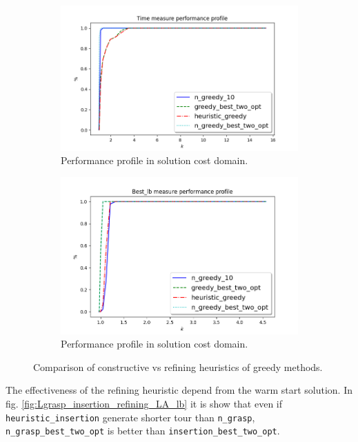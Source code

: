 \begin{figure}
	\centering
	\begin{subfigure}{.7\textwidth}
		\centering
		\includegraphics[width=\columnwidth]{../res/Lgreedy_refining_LA_time.png}
		\caption{Performance profile in solution cost domain.}
		\label{fig:Lgreedy_refining_LA_time}
	\end{subfigure}
	\begin{subfigure}{.7\textwidth}
		\centering
		\includegraphics[width=\columnwidth]{../res/Lgreedy_refining_LA_lb.png}
		\caption{Performance profile in solution cost domain.}
		\label{fig:Lgreedy_refining_LA_lb}
	\end{subfigure}
	\caption{Comparison of constructive vs refining heuristics of greedy methods.}
	\label{fig:pp_Lgreedy_refining}
\end{figure}


The effectiveness of the refining heuristic depend from the warm start solution. In fig. \ref{fig:Lgrasp_insertion_refining_LA_lb} it is show that even if \texttt{heuristic\_insertion} generate shorter tour than \texttt{n\_grasp}, \texttt{n\_grasp\_best\_two\_opt} is better than \texttt{insertion\_best\_two\_opt}.

